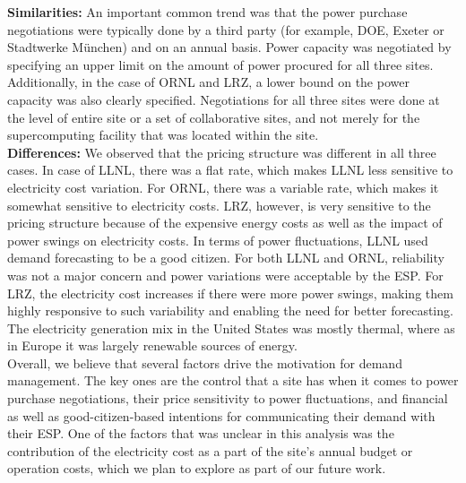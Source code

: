 {\bf Similarities:}
An important common trend was that the power purchase negotiations were typically done by a third party (for example, DOE, Exeter or Stadtwerke M{\"u}nchen) and on an annual basis. Power capacity was negotiated by specifying an upper limit on the amount of power procured for all three sites. Additionally, in the case of ORNL and LRZ, a lower bound on the power capacity was also clearly specified. Negotiations for all three sites were done at the level of entire site or a set of collaborative sites, and not merely for the supercomputing facility that was located within the site.\\

{\bf Differences:}
We observed that the pricing structure was different in all three cases. In case of LLNL, there was a flat rate, which makes LLNL less sensitive to electricity cost variation. For ORNL, there was a variable rate, which makes it somewhat sensitive to electricity costs. LRZ, however, is very sensitive to the pricing structure because of the expensive energy costs as well as the impact of power swings on electricity costs. In terms of power fluctuations, LLNL used demand forecasting to be a good citizen. For both LLNL and ORNL, reliability was not a major concern and power variations were acceptable by the ESP. For LRZ, the electricity cost increases if there were more power swings, making them highly responsive to such variability and enabling the need for better forecasting. The electricity generation mix in the United States was mostly thermal, where as in Europe it was largely renewable sources of energy. \\

Overall, we believe that several factors drive the motivation for demand management. The key ones are the control that a site has when it comes to power purchase negotiations, their price sensitivity to power fluctuations, and financial as well as good-citizen-based intentions for communicating their demand with their ESP. One of the factors that was unclear in this analysis was the contribution of the electricity cost as a part of the site's annual budget or operation costs, which we plan to explore as part of our future work.